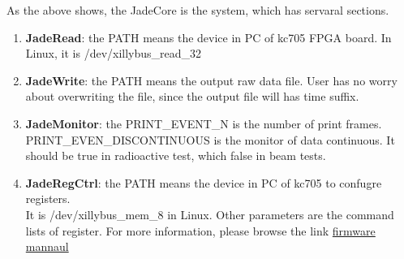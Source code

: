 \documentclass[12pt,a4paper]{article}
\begin{document}
As the above shows, the JadeCore is the system, which has servaral
sections.
\begin{enumerate}
	\item{
	      \textbf{JadeRead}: the PATH means the device in PC of kc705 FPGA
	      board. In Linux, it is /dev/xillybus\_read\_32}
	\item{\textbf{JadeWrite}: the PATH
	      means the output raw data file. User has no worry about overwriting the
	      file, since the output file will has time suffix.}
	\item{
	      \textbf{JadeMonitor}: the PRINT\_EVENT\_N is the number of print frames. \\
	      PRINT\_EVEN\_DISCONTINUOUS is the monitor of data continuous. It should
	      be true in radioactive test, which false in beam tests.}
	\item{
				\textbf{JadeRegCtrl}: the PATH means the device in PC of kc705 to confugre registers. \\ 
				It is /dev/xillybus\_mem\_8 in Linux. Other parameters are the command lists
				of register. For more information, please browse the link \href{
	      https://github.com/cepc/kc705/blob/v1.2/doc/Firmware\_v1.2\_Info.md}{firmware mannaul}}
\end{enumerate}
\end{document}
